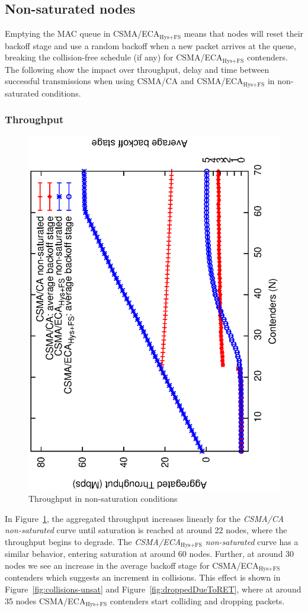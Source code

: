 	\subsection{Non-saturated nodes}\label{resultsUnsaturated}
	Emptying the MAC queue in CSMA/ECA$_{\text{Hys+FS}}$ means that nodes will reset their backoff stage and use a random backoff when a new packet arrives at the queue, breaking the collision-free schedule (if any) for CSMA/ECA$_{\text{Hys+FS}}$ contenders. The following show the impact over throughput, delay and time between successful transmissions when using CSMA/CA and CSMA/ECA$_{\text{Hys+FS}}$ in non-saturated conditions.\\
	
	\subsubsection{Throughput}
	
   	\begin{figure}[tb]
		\centering
		\includegraphics[width=0.7\linewidth,angle=-90]{figures/unsaturated/throughput-unsaturated/throughput-unsaturated-w-BOS.eps}
		\caption{Throughput in non-saturation conditions}
		\label{fig:throughputUnsat}
	\end{figure}
	
	In Figure~\ref{fig:throughputUnsat}, the aggregated throughput increases linearly for the \emph{CSMA/CA non-saturated} curve until saturation is reached at around 22 nodes, where the throughput begins to degrade. The \emph{CSMA/ECA$_{\text{Hys+FS}}$ non-saturated} curve has a similar behavior, entering saturation at around 60 nodes. Further, at around 30 nodes we see an increase in the average backoff stage for CSMA/ECA$_{\text{Hys+FS}}$ contenders which suggests an increment in collisions. This effect is shown in Figure~\ref{fig:collisions-unsat} and Figure~\ref{fig:droppedDueToRET}, where at around 35 nodes CSMA/ECA$_{\text{Hys+FS}}$ contenders start colliding and dropping packets. 
	
